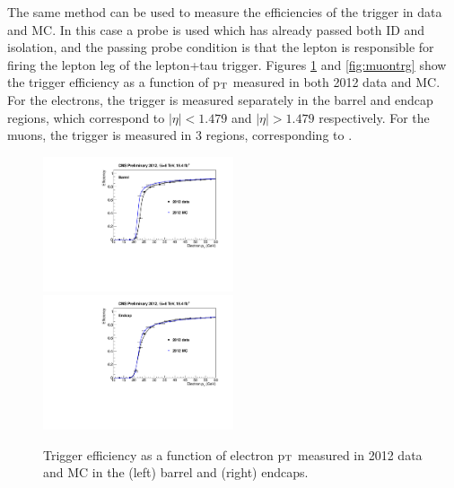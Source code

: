 \noindent The same method can be used to measure the efficiencies of the trigger
in data and MC. In this case a probe is used which has already passed both ID
and isolation, and the passing probe condition is that the lepton is responsible
for firing the lepton leg of the lepton+tau trigger. Figures
\ref{fig:electrontrg} and \ref{fig:muontrg} show the trigger efficiency as a
function of p$_{\rm{T}}$ measured in both 2012 data and MC. For the
electrons, the trigger is measured separately in the barrel and endcap
regions, which correspond to $|\eta| < 1.479$ and $|\eta| > 1.479$
respectively. For the muons, the trigger is measured in 3 regions, corresponding
to .

\begin{figure}[h!]
\includegraphics[width=0.5\textwidth]{plots/TagAndProbe/ElectronBarrel2012DatavsMC.pdf}
\includegraphics[width=0.5\textwidth]{plots/TagAndProbe/ElectronEndcap2012DatavsMC.pdf}
\caption{Trigger efficiency as a function of electron p$_{\rm{T}}$ measured
in 2012 data and MC in the (left) barrel and (right) endcaps.}
\label{fig:electrontrg}
\end{figure}

